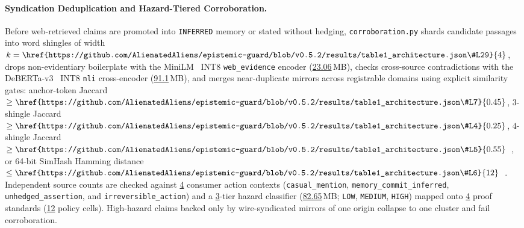 \documentclass[10pt,twocolumn]{article}
\begin{document}
\paragraph{Syndication Deduplication and Hazard-Tiered Corroboration.}
Before web-retrieved claims are promoted into \texttt{INFERRED} memory or stated without hedging, \texttt{corroboration.py} shards candidate passages into word shingles of width $k=\href{https://github.com/AlienatedAliens/epistemic-guard/blob/v0.5.2/results/table1_architecture.json\#L29}{4}$, drops non-evidentiary boilerplate with the MiniLM~\cite{wang2020minilm} INT8 \texttt{web\_evidence} encoder (\href{https://github.com/AlienatedAliens/epistemic-guard/blob/v0.5.2/results/table1_architecture.json\#L22}{23.06}\,MB), checks cross-source contradictions with the DeBERTa-v3~\cite{he2023debertav3} INT8 \texttt{nli} cross-encoder (\href{https://github.com/AlienatedAliens/epistemic-guard/blob/v0.5.2/results/table1_architecture.json\#L21}{91.1}\,MB), and merges near-duplicate mirrors across registrable domains using explicit similarity gates: anchor-token Jaccard $\ge \href{https://github.com/AlienatedAliens/epistemic-guard/blob/v0.5.2/results/table1_architecture.json\#L7}{0.45}$, $3$-shingle Jaccard $\ge \href{https://github.com/AlienatedAliens/epistemic-guard/blob/v0.5.2/results/table1_architecture.json\#L4}{0.25}$, $4$-shingle Jaccard $\ge \href{https://github.com/AlienatedAliens/epistemic-guard/blob/v0.5.2/results/table1_architecture.json\#L5}{0.55}$~\cite{broder1997resemblance}, or 64-bit SimHash Hamming distance $\le \href{https://github.com/AlienatedAliens/epistemic-guard/blob/v0.5.2/results/table1_architecture.json\#L6}{12}$~\cite{charikar2002similarity}. Independent source counts are checked against \href{https://github.com/AlienatedAliens/epistemic-guard/blob/v0.5.2/results/table1_architecture.json\#L2}{4} consumer action contexts (\texttt{casual\_\allowbreak mention}, \texttt{memory\_\allowbreak commit\_\allowbreak inferred}, \texttt{unhedged\_\allowbreak assertion}, and \texttt{irreversible\_\allowbreak action}) and a \href{https://github.com/AlienatedAliens/epistemic-guard/blob/v0.5.2/results/table1_architecture.json\#L13}{3}-tier hazard classifier (\href{https://github.com/AlienatedAliens/epistemic-guard/blob/v0.5.2/results/table1_architecture.json\#L20}{82.65}\,MB; \texttt{LOW}, \texttt{MEDIUM}, \texttt{HIGH}) mapped onto \href{https://github.com/AlienatedAliens/epistemic-guard/blob/v0.5.2/results/table1_architecture.json\#L27}{4} proof standards (\href{https://github.com/AlienatedAliens/epistemic-guard/blob/v0.5.2/results/table1_architecture.json\#L26}{12} policy cells). High-hazard claims backed only by wire-syndicated mirrors of one origin collapse to one cluster and fail corroboration.
\end{document}
